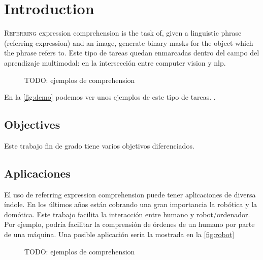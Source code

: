 

\chapter{Introduction}



\lettrine{R}{eferring} expression comprehension is the task of, given a
linguistic phrase (referring expression) and an image, generate binary masks
for the object which the phrase refers to. Este tipo de tareas quedan
enmarcadas dentro del campo del aprendizaje multimodal: en la intersección
entre computer vision y \gls{nlp}.

\begin{figure}[ht]
  \centering
  \caption[TODO]{TODO: ejemplos de comprehension}
  \label{fig:demo}
\end{figure}

En la \vref{fig:demo} podemos ver unos ejemplos de este tipo de tareas.
.


\section{Objectives}

Este trabajo fin de grado tiene varios objetivos diferenciados.


\section{Aplicaciones}

El uso de referring expression comprehension puede tener aplicaciones de
diversa índole. En los últimos años están cobrando una gran importancia la
robótica y la domótica. Este trabajo facilita la interacción entre humano y
robot/ordenador. Por ejemplo, podría facilitar la comprensión de órdenes de un
humano por parte de una máquina. Una posible aplicación sería la mostrada en la
\vref{fig:robot}

\begin{figure}[ht]
  \centering
  \caption[TODO]{TODO: ejemplos de comprehension}
  \label{fig:robot}
\end{figure}

